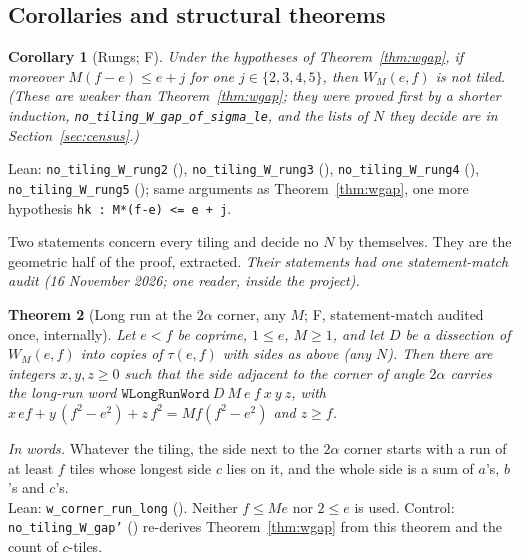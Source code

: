 \documentclass[11pt,reqno]{amsart}
\theoremstyle{plain}
\newtheorem{theorem}{Theorem}[section]
\newtheorem{corollary}[theorem]{Corollary}
\theoremstyle{definition}
\newcommand{\sF}{\textup{\textsf{F}}}
\begin{document}
\subsection{Corollaries and structural theorems}\label{sub:wgap:struct}

\begin{corollary}[Rungs; \sF]\label{cor:wrung}
Under the hypotheses of Theorem~\ref{thm:wgap}, if moreover $M(f-e)\le e+j$ for one $j\in\{2,3,4,5\}$, then
$W_M(e,f)$ is not tiled. (These are weaker than Theorem~\ref{thm:wgap}; they were proved first by a shorter
induction, \texttt{no\_tiling\_W\_gap\_of\_sigma\_le}, and the lists of $N$ they decide are in Section~\ref{sec:census}.)
\end{corollary}
\noindent Lean: \texttt{no\_tiling\_W\_rung2} (), \texttt{no\_tiling\_W\_rung3}
(), \texttt{no\_tiling\_W\_rung4} (),
\texttt{no\_tiling\_W\_rung5} (); same arguments as Theorem~\ref{thm:wgap}, one more
hypothesis \texttt{hk : M*(f-e) <= e + j}.

Two statements concern every tiling and decide no $N$ by themselves. They are the geometric half of the proof,
extracted. \emph{Their statements had one statement-match audit (16 November 2026; one reader, inside the project).}

\begin{theorem}[Long run at the $2\alpha$ corner, any $M$; \sF, statement-match audited once, internally]\label{thm:wrun}
Let $e<f$ be coprime, $1\le e$, $M\ge1$, and let $D$ be a dissection of $W_M(e,f)$ into copies of $\tau(e,f)$
with sides as above (any $N$). Then there are integers $x,y,z\ge0$ such that the side adjacent to the corner of
angle $2\alpha$ carries the long-run word $\texttt{WLongRunWord}\ D\ M\ e\ f\ x\ y\ z$, with
$x\,ef+y\,(f^2-e^2)+z\,f^2=Mf(f^2-e^2)$ and $z\ge f$.
\end{theorem}
\noindent\emph{In words.} Whatever the tiling, the side next to the $2\alpha$ corner starts with a run of at least $f$ tiles
whose longest side $c$ lies on it, and the whole side is a sum of $a$'s, $b$'s and $c$'s.\\
\noindent Lean: \texttt{w\_corner\_run\_long} (). Neither $f\le Me$ nor $2\le e$ is
used. Control: \texttt{no\_tiling\_W\_gap'} () re-derives Theorem~\ref{thm:wgap}
from this theorem and the count of $c$-tiles.
\end{document}
